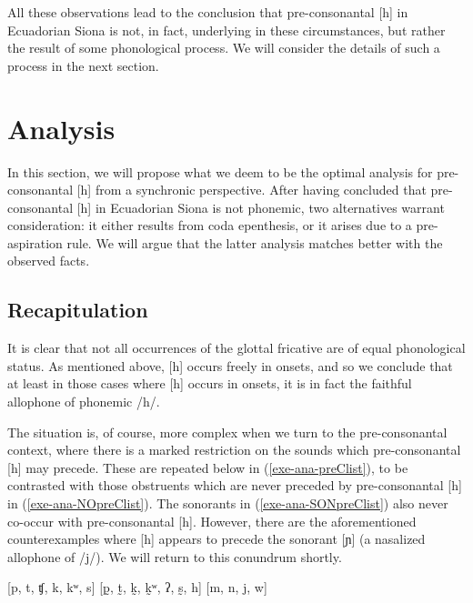 \documentclass[output=paper]{langscibook}
\begin{document}
All these observations lead to the conclusion that pre-consonantal [h] in Ecuadorian Siona is not, in fact, underlying in these circumstances, but rather the result of some phonological process. We will consider the details of such a process in the next section.


\section{Analysis}\label{sec-analysis}
In this section, we will propose what we deem to be the optimal analysis for pre-consonantal [h] from a synchronic perspective. After having concluded that pre-consonantal [h] in Ecuadorian Siona is not phonemic, two alternatives warrant consideration: it either results from coda epenthesis, or it arises due to a pre-aspiration rule. We will argue that the latter analysis matches better with the observed facts.


\subsection{Recapitulation}\label{sec-synch}
It is clear that not all occurrences of the glottal fricative are of equal phonological status. As mentioned above, [h] occurs freely in onsets, and so we conclude that at least in those cases where [h] occurs in onsets, it is in fact the faithful allophone of phonemic /h/.

The situation is, of course, more complex when we turn to the pre-consonantal context, where there is a marked restriction on the sounds which pre-con\-so\-nan\-tal [h] may precede. These are repeated below in (\ref{exe-ana-preClist}), to be contrasted with those obstruents which are never preceded by pre-consonantal [h] in (\ref{exe-ana-NOpreClist}). The sonorants in (\ref{exe-ana-SONpreClist}) also never co-occur with pre-consonantal [h]. However, there are the aforementioned counterexamples where [h] appears to precede the sonorant [ɲ] (a nasalized allophone of /j/). We will return to this conundrum shortly.


\begin{exe}
	\ex
	\begin{xlist}
		\ex\label{exe-ana-preClist} {[}p, t, ʧ, k, kʷ, s]
		\ex\label{exe-ana-NOpreClist} {[}p̰, t̰, k̰, k̰ʷ, ʔ, s̰, h]
		\ex\label{exe-ana-SONpreClist} {[}m, n, j, w]
	\end{xlist}
\end{exe}
\end{document}
